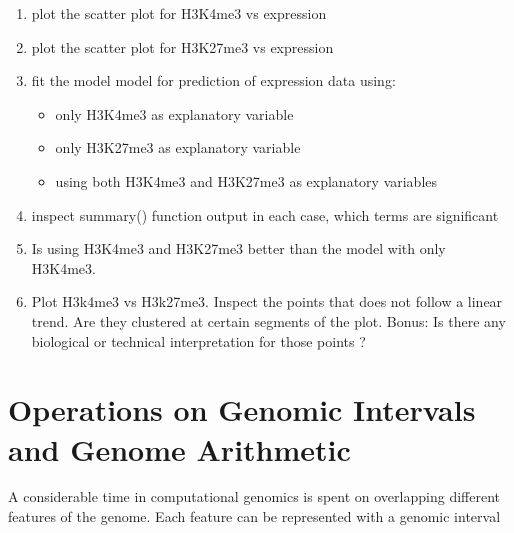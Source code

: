 \documentclass[12pt,]{krantz}
\providecommand{\tightlist}{%
  \setlength{\itemsep}{0pt}\setlength{\parskip}{0pt}}
\theoremstyle{definition}
\theoremstyle{definition}
\theoremstyle{definition}
\theoremstyle{remark}
\begin{document}
\begin{enumerate}
\def\labelenumi{\arabic{enumi}.}
\tightlist
\item
  plot the scatter plot for H3K4me3 vs expression
\item
  plot the scatter plot for H3K27me3 vs expression
\item
  fit the model model for prediction of expression data using:

  \begin{itemize}
  \tightlist
  \item
    only H3K4me3 as explanatory variable
  \item
    only H3K27me3 as explanatory variable
  \item
    using both H3K4me3 and H3K27me3 as explanatory variables
  \end{itemize}
\item
  inspect summary() function output in each case, which terms are
  significant
\item
  Is using H3K4me3 and H3K27me3 better than the model with only H3K4me3.
\item
  Plot H3k4me3 vs H3k27me3. Inspect the points that does not follow a
  linear trend. Are they clustered at certain segments of the plot.
  Bonus: Is there any biological or technical interpretation for those
  points ?
\end{enumerate}

\hypertarget{genomicIntervals}{%
\chapter{Operations on Genomic Intervals and Genome
Arithmetic}\label{genomicIntervals}}

A considerable time in computational genomics is spent on overlapping
different features of the genome. Each feature can be represented with a
genomic interval



\backmatter
\printindex
\end{document}
